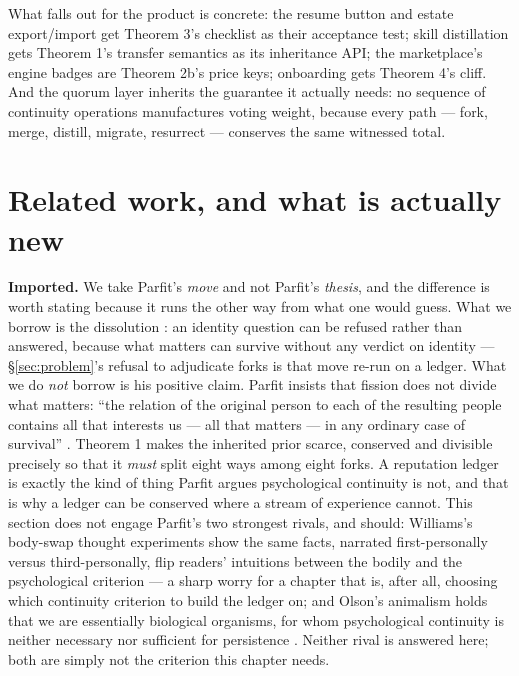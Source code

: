 \documentclass[11pt,a4paper]{article}
\begin{document}
What falls out for the product is concrete: the resume button and estate export/import get Theorem 3's checklist as their
acceptance test; skill distillation gets Theorem 1's transfer semantics as its inheritance API; the marketplace's engine badges are
Theorem 2b's price keys; onboarding gets Theorem 4's cliff. And the quorum layer inherits the guarantee it actually needs: no
sequence of continuity operations manufactures voting weight, because every path --- fork, merge, distill, migrate, resurrect ---
conserves the same witnessed total.

\section{Related work, and what is actually new}\label{sec:related}

\textbf{Imported.} We take Parfit's \emph{move} and not Parfit's \emph{thesis}, and the difference is worth stating because it
runs the other way from what one would guess. What we borrow is the dissolution \cite{parfit,parfit1971}: an identity question
can be refused rather than answered, because what matters can survive without any verdict on identity --- \S\ref{sec:problem}'s
refusal to adjudicate forks is that move re-run on a ledger. What we do \emph{not} borrow is his positive claim. Parfit insists
that fission does not divide what matters: ``the relation of the original person to each of the resulting people contains all
that interests us --- all that matters --- in any ordinary case of survival'' \cite{parfit1971}. Theorem 1 makes the inherited
prior scarce, conserved and divisible precisely so that it \emph{must} split eight ways among eight forks. A reputation ledger is
exactly the kind of thing Parfit argues psychological continuity is not, and that is why a ledger can be conserved where a stream
of experience cannot. This section does not engage Parfit's two strongest rivals, and should: Williams's body-swap thought
experiments show the same facts, narrated first-personally versus third-personally, flip readers' intuitions between the bodily
and the psychological criterion \cite{williams1970} --- a sharp worry for a chapter that is, after all, choosing which continuity
criterion to build the ledger on; and Olson's animalism holds that we are essentially biological organisms, for whom psychological
continuity is neither necessary nor sufficient for persistence \cite{olson2007}. Neither rival is answered here; both are simply
not the criterion this chapter needs.
\end{document}
